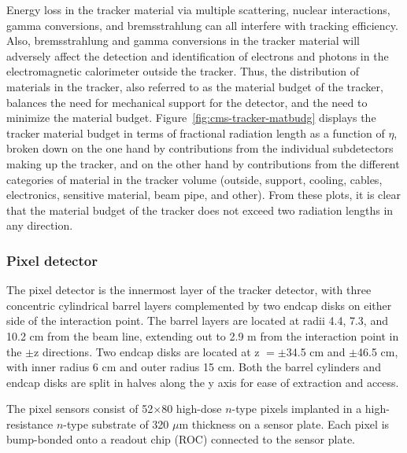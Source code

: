 Energy loss in the tracker material via multiple scattering, nuclear interactions, gamma conversions, and bremsstrahlung can all interfere with tracking efficiency. Also, bremsstrahlung and gamma conversions in the tracker material will adversely affect the detection and identification of electrons and photons in the electromagnetic calorimeter outside the tracker. Thus, the distribution of materials in the tracker, also referred to as the material budget of the tracker, balances  the need for mechanical support for the detector, and the need to minimize the material budget. Figure~\ref{fig:cms-tracker-matbudg} displays the tracker material budget in terms of fractional radiation length as a function of $\eta$, broken down on the one hand by contributions from the individual subdetectors making up the tracker, and on the other hand by contributions from the different categories of material in the tracker volume (outside, support, cooling, cables, electronics, sensitive material, beam pipe, and other). From these plots, it is clear that the material budget of the tracker does not exceed two radiation lengths in any direction.

\subsubsection{Pixel detector\label{sec:cms-pixel}}

The pixel detector is the innermost layer of the tracker detector, with three concentric cylindrical barrel layers complemented by two endcap disks on either side of the interaction point. The barrel layers are located at radii 4.4, 7.3, and 10.2 cm from the beam line, extending out to 2.9 m from the interaction point in the $\pm$z directions. Two endcap disks are located at z $= \pm$34.5 cm and $\pm$46.5 cm, with inner radius 6 cm and outer radius 15 cm. Both the barrel cylinders and endcap disks are split in halves along the y axis for ease of extraction and access.

The pixel sensors consist of 52$\times$80 high-dose $n$-type pixels implanted in a high-resistance $n$-type substrate of 320 $\mu$m thickness on a sensor plate. Each pixel is bump-bonded onto a readout chip (ROC) connected to the sensor plate.

